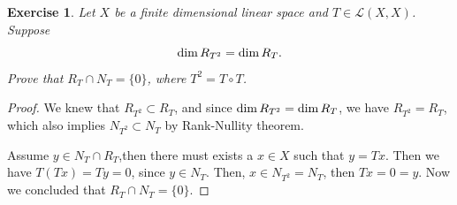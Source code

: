 \documentclass[11pt]{book}
\newtheorem{exercise}{Exercise}[section]
\theoremstyle{definition}
\numberwithin{equation}{chapter}
\begin{document}
\medskip

\begin{exercise}
Let $X$ be a finite dimensional linear space and $T\in\mathscr{L}(X,X)$. Suppose $${\rm dim}\, R_{T^2} = {\rm dim}\, R_T.$$
Prove that $R_T\cap N_T = \{0\}$, where $T^2 = T\circ T$.
\end{exercise}
\begin{proof}
We knew that $R_{T^2}\subset R_T$, and since ${\rm dim}\, R_{T^2} = {\rm dim}\, R_T$, we have $R_{T^2} = R_T$, which also implies $N_{T^2}\subset N_T$ by Rank-Nullity theorem.

Assume $y\in N_T\cap R_T$,then there must exists a $x\in X$ such that $y = T x$. Then we have $T(Tx) = Ty = 0$, since $y\in N_T$. Then, $x\in N_{T^2} = N_T$, then $Tx = 0 = y$. Now we concluded that $R_T\cap N_T = \{0\}$.
\end{proof}

\medskip
\end{document}

